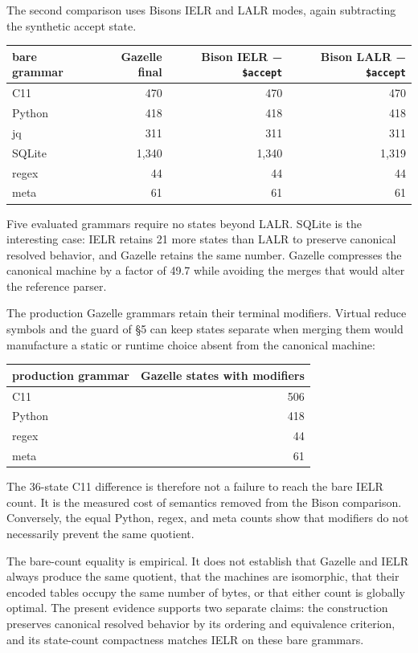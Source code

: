 \documentclass[
  10pt,
]{article}
\begin{document}
The second comparison uses Bison\textquotesingle s IELR and LALR modes,
again subtracting the synthetic accept state.

\begin{longtable}[]{@{}lrrr@{}}
\toprule\noalign{}
bare grammar & Gazelle final & Bison IELR − \texttt{\$accept} & Bison
LALR − \texttt{\$accept} \\
\midrule\noalign{}
\endhead
\bottomrule\noalign{}
\endlastfoot
C11 & 470 & 470 & 470 \\
Python & 418 & 418 & 418 \\
jq & 311 & 311 & 311 \\
SQLite & 1,340 & 1,340 & 1,319 \\
regex & 44 & 44 & 44 \\
meta & 61 & 61 & 61 \\
\end{longtable}

Five evaluated grammars require no states beyond LALR. SQLite is the
interesting case: IELR retains 21 more states than LALR to preserve
canonical resolved behavior, and Gazelle retains the same number.
Gazelle compresses the canonical machine by a factor of 49.7 while
avoiding the merges that would alter the reference parser.

The production Gazelle grammars retain their terminal modifiers. Virtual
reduce symbols and the guard of §5 can keep states separate when merging
them would manufacture a static or runtime choice absent from the
canonical machine:

\begin{longtable}[]{@{}lr@{}}
\toprule\noalign{}
production grammar & Gazelle states with modifiers \\
\midrule\noalign{}
\endhead
\bottomrule\noalign{}
\endlastfoot
C11 & 506 \\
Python & 418 \\
regex & 44 \\
meta & 61 \\
\end{longtable}

The 36-state C11 difference is therefore not a failure to reach the bare
IELR count. It is the measured cost of semantics removed from the Bison
comparison. Conversely, the equal Python, regex, and meta counts show
that modifiers do not necessarily prevent the same quotient.

The bare-count equality is empirical. It does not establish that Gazelle
and IELR always produce the same quotient, that the machines are
isomorphic, that their encoded tables occupy the same number of bytes,
or that either count is globally optimal. The present evidence supports
two separate claims: the construction preserves canonical resolved
behavior by its ordering and equivalence criterion, and its state-count
compactness matches IELR on these bare grammars.
\end{document}
